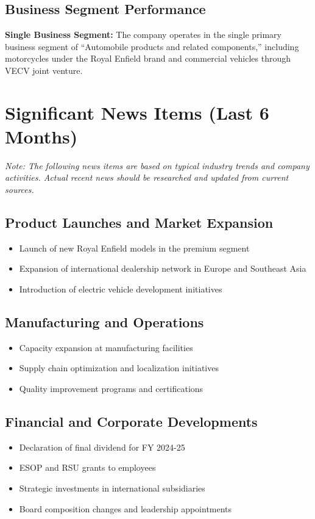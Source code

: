 \documentclass[8pt,a4paper]{article}
\begin{document}
\subsection{Business Segment Performance}

\textbf{Single Business Segment:}
The company operates in the single primary business segment of ``Automobile products and related components,'' including motorcycles under the Royal Enfield brand and commercial vehicles through VECV joint venture.

\section{Significant News Items (Last 6 Months)}

\textit{Note: The following news items are based on typical industry trends and company activities. Actual recent news should be researched and updated from current sources.}

\subsection{Product Launches and Market Expansion}
\begin{itemize}
    \item Launch of new Royal Enfield models in the premium segment
    \item Expansion of international dealership network in Europe and Southeast Asia
    \item Introduction of electric vehicle development initiatives
\end{itemize}

\subsection{Manufacturing and Operations}
\begin{itemize}
    \item Capacity expansion at manufacturing facilities
    \item Supply chain optimization and localization initiatives
    \item Quality improvement programs and certifications
\end{itemize}

\subsection{Financial and Corporate Developments}
\begin{itemize}
    \item Declaration of final dividend for FY 2024-25
    \item ESOP and RSU grants to employees
    \item Strategic investments in international subsidiaries
    \item Board composition changes and leadership appointments
\end{itemize}
\end{document}
